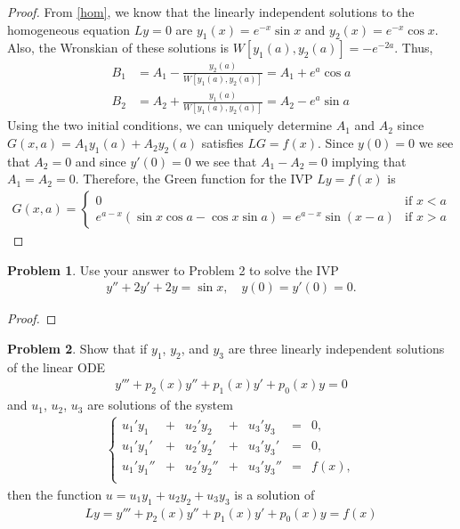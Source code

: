 \documentclass[12pt]{article}
\theoremstyle{definition}
\newtheorem{problem}{Problem}
\begin{document}
\begin{proof}
  From \eqref{hom}, we know that the linearly independent solutions to the
  homogeneous equation $Ly = 0$ are $y_1(x) = e^{-x}\sin x$ and $y_2(x) = e^{-x}\cos x$.
  Also, the Wronskian of these solutions is $W[y_1(a), y_2(a)] = -e^{-2a}$. Thus,
  \begin{align*}
    B_1 &= A_1 - \frac{y_2(a)}{W[y_1(a),y_2(a)]} = A_1 + e^{a}\cos a \\
    B_2 &= A_2 + \frac{y_1(a)}{W[y_1(a),y_2(a)]} = A_2 - e^{a}\sin a
  \end{align*}
  Using the two initial conditions, we can uniquely determine $A_1$ and $A_2$
  since $G(x, a) = A_1y_1(a) + A_2y_2(a)$ satisfies $LG = f(x)$. Since $y(0) = 0$
  we see that $A_2 = 0$ and since $y'(0) = 0$ we see that $A_1 - A_2 = 0$ implying that
  $A_1 = A_2 = 0$. Therefore, the Green function for the IVP $Ly = f(x)$ is
  \begin{align}\label{green}
    G(x, a) =
    \begin{cases}
      0 & \text{if $x < a$} \\
      e^{a-x}\left(\sin x\cos a  - \cos x \sin a \right) = e^{a-x}\sin (x - a) & \text{if $x > a$}
    \end{cases}
  \end{align}
\end{proof}
\newpage


\begin{problem}
  Use your answer to Problem 2 to solve the IVP
  \begin{align*}
    y'' + 2y' + 2y = \sin x, \quad y(0) = y'(0) = 0.
  \end{align*}
\end{problem}

\begin{proof}
\end{proof}
\newpage


\begin{problem}
  Show that if $y_1$, $y_2$, and $y_3$ are three linearly independent solutions
  of the linear ODE
  \begin{align*}
    y''' + p_2(x)y'' + p_1(x)y' + p_0(x) y = 0
  \end{align*}
  and $u_1$, $u_2$, $u_3$ are solutions of the system
  \begin{align}\label{u_system}
    \left\{
      \begin{array}{lllllll}
        u_1'y_1 &+& u_2'y_2 &+& u_3'y_3 &=& 0, \\
        u_1'y_1' &+& u_2'y_2' &+& u_3'y_3' &=& 0, \\
        u_1'y_1'' &+& u_2'y_2'' &+& u_3'y_3'' &=& f(x), \\
      \end{array}
    \right.
  \end{align}
  then the function $u = u_1 y_1 + u_2 y_2 + u_3 y_3$ is a solution of
  \begin{align*}
    Ly = y''' + p_2(x)y'' + p_1(x)y' + p_0(x) y = f(x)
  \end{align*}
\end{problem}
\end{document}
